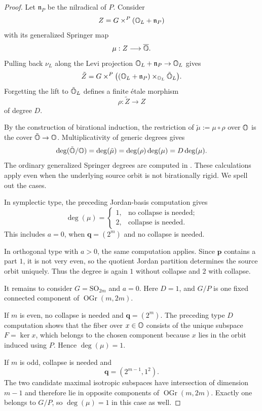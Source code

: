 \begin{proof}
  Let $\mathfrak n_P$ be the nilradical of $P$.
  Consider
  \[
    Z=G\times^P(\mathbb{O}_L+\mathfrak n_P)
  \]
  with its generalized Springer map
  \[
    \mu:Z\longrightarrow\overline{\mathbb{O}}.
  \]
  Pulling back $\nu_L$ along the Levi projection
  $\mathbb{O}_L+\mathfrak n_P\to\mathbb{O}_L$ gives
  \[
    \tilde Z
    =
    G\times^P
    \bigl(
      (\mathbb{O}_L+\mathfrak n_P)
      \times_{\mathbb{O}_L}\tilde{\mathbb{O}}_L
    \bigr).
  \]
  Forgetting the lift to $\tilde{\mathbb{O}}_L$ defines
  a finite \'etale morphism
  \[
    \rho:\tilde Z\longrightarrow Z
  \]
  of degree $D$.

  By the construction of birational induction,
  the restriction of $\tilde\mu:=\mu\circ\rho$
  over $\mathbb{O}$ is the cover $\tilde{\mathbb{O}}\to\mathbb{O}$.
  Multiplicativity of generic degrees gives
  \[
    \deg(\tilde{\mathbb{O}}/\mathbb{O})
    =
    \deg(\tilde\mu)
    =
    \deg(\rho)\deg(\mu)
    =
    D\deg(\mu).
  \]
  The ordinary generalized Springer degrees are computed in
  \cite[Claims~2.3.1--2.3.2 and 3.6.1--3.6.2]{Namikawa2022Cover}.
  These calculations apply even when the underlying source orbit
  is not birationally rigid. We spell out the cases.

  In symplectic type, the preceding Jordan-basis
  computation gives
  \[
    \deg(\mu)=
    \begin{cases}
      1,&\text{no collapse is needed};\\
      2,&\text{collapse is needed}.
    \end{cases}
  \]
  This includes $a=0$, when $\mathbf q=(2^m)$
  and no collapse is needed.

  In orthogonal type with $a>0$, the same computation
  applies. Since $\mathbf p$ contains a part $1$,
  it is not very even, so the quotient Jordan
  partition determines the source orbit uniquely.
  Thus the degree is again $1$ without collapse
  and $2$ with collapse.

  It remains to consider
  $G=\mathrm{SO}_{2m}$ and $a=0$.
  Here $D=1$, and $G/P$ is one fixed connected
  component of $\operatorname{OGr}(m,2m)$.

  If $m$ is even, no collapse is needed and
  $\mathbf q=(2^m)$.
  The preceding type $D$ computation shows that
  the fiber over $x\in\mathbb{O}$ consists of the unique
  subspace $F=\ker x$, which belongs to the chosen
  component because $x$ lies in the orbit induced
  using $P$. Hence $\deg(\mu)=1$.

  If $m$ is odd, collapse is needed and
  \[
    \mathbf q=(2^{m-1},1^2).
  \]
  The two candidate maximal isotropic subspaces
  have intersection of dimension $m-1$ and
  therefore lie in opposite components of
  $\operatorname{OGr}(m,2m)$.
  Exactly one belongs to $G/P$, so
  $\deg(\mu)=1$ in this case as well.
\end{proof}

